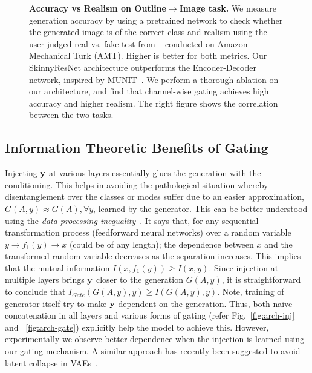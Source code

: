 \begin{figure}[t]
\begin{minipage}[b]{0.48\linewidth}
  \end{minipage}
  \caption{\small {\bf Accuracy vs Realism on Outline$\rightarrow$Image task.} We measure generation accuracy by using a pretrained network to check whether the generated image is of the correct class and realism using the user-judged real vs. fake test from ~\cite{zhang2016colorful,isola2016image2image} conducted on Amazon Mechanical Turk (AMT). Higher is better for both metrics. Our SkinnyResNet architecture outperforms the Encoder-Decoder network, inspired by MUNIT~\cite{huang2018multimodal}. We perform a thorough ablation on our architecture, and find that channel-wise gating achieves high accuracy and higher realism. The right figure shows the correlation between the two tasks.
  }
  \label{fig:acc_vs_real}
\end{figure}





\subsection{Information Theoretic Benefits of Gating}
\label{sec:infoGAN} 
Injecting ${\bf y}$ at various layers essentially glues the generation with the conditioning.
This helps in avoiding the pathological situation whereby disentanglement over the classes or modes suffer due to an easier approximation, $G(A,y) \approx G(A), \forall y$, learned by the generator. This can be better understood using the {\em data processing inequality}~\cite{cover2012informationTheory}. It says that, for any sequential transformation process (\eg feedforward neural networks) over a random variable $y \to f_1(y) \to  x$ (could be of any length); the dependence between $x$ and the transformed random variable decreases as the separation increases. 
This implies that the mutual information $I(x, f_1(y)) \geq I (x, y)$. Since injection at multiple layers brings ${\bf y}$ closer to the generation $G(A,y)$, it is straightforward to conclude that $I_{Gate}(G(A,y), y) \geq I(G(A,y), y)$. Note, training of generator itself try to make ${\bf y}$ dependent on the generation. Thus, both naive concatenation in all layers and various forms of gating (refer Fig.~\ref{fig:arch-inj} and ~\ref{fig:arch-gate}) explicitly help the model to achieve this. However, experimentally we observe better dependence when the injection is learned using our gating mechanism. %
A similar approach has recently been suggested to avoid latent collapse in VAEs~\cite{Dieng18skipVAE}. 

